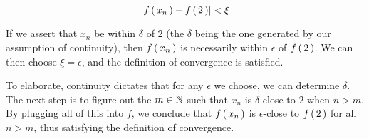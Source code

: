 \begin{example}
\begin{enumerate}
    \begin{equation}
      \left| f \left(\, x_n \,\right) - f \left(\, 2 \,\right) \right| < \xi
    \end{equation}

  \end{enumerate}

  If we assert that $x_n$ be within $\delta$ of $2$ (the $\delta$ being the one
  generated by our assumption of continuity), then $f \left(\, x_n \,\right)$ is necessarily
  within $\epsilon$ of $f \left(\, 2 \,\right)$. We can then choose $\xi = \epsilon$, and
  the definition of convergence is satisfied.

  To elaborate, continuity dictates that for any $\epsilon$ we choose, we can
  determine $\delta$. The next step is to figure out the $m \in \mathbb{N}$ such that
  $x_n$ is $\delta$-close to $2$ when $n > m$. By plugging all of this into $f$,
  we conclude that $f \left(\, x_n \,\right)$ is $\epsilon$-close to $f \left(\, 2 \,\right)$ for all
  $n > m$, thus satisfying the definition of convergence.
\end{example}

\begin{example}
  
\end{example}